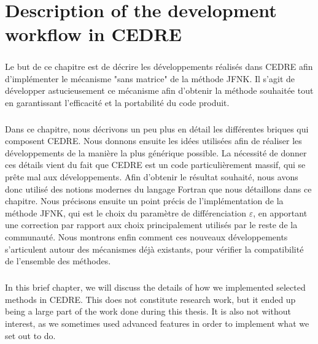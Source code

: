 \chapter{Description of the development workflow in CEDRE}

\begin{tcolorbox}[title=Résumé du chapitre : Description des développements dans CEDRE, colframe=black!50!white]
  \paragraph{}
  Le but de ce chapitre est de décrire les développements réalisés dans CEDRE afin d'implémenter le mécanisme "sans matrice" de la méthode JFNK.
  Il s'agit de développer astucieusement ce mécanisme afin d'obtenir la méthode souhaitée tout en garantissant l'efficacité et la portabilité du code produit.

  \paragraph{}
  Dans ce chapitre, nous décrivons un peu plus en détail les différentes briques qui composent CEDRE.
  Nous donnons ensuite les idées utilisées afin de réaliser les développements de la manière la plus générique possible.
  La nécessité de donner ces détails vient du fait que CEDRE est un code particulièrement massif, qui se prête mal aux développements.
  Afin d'obtenir le résultat souhaité, nous avons donc utilisé des notions modernes du langage Fortran que nous détaillons dans ce chapitre.
  Nous précisons ensuite un point précis de l'implémentation de la méthode JFNK, qui est le choix du paramètre de différenciation $\varepsilon$, en apportant une correction par rapport aux choix principalement utilisés par le reste de la communauté.
  Nous montrons enfin comment ces nouveaux développements s'articulent autour des mécanismes déjà existants, pour vérifier la compatibilité de l'ensemble des méthodes.
\end{tcolorbox}


  \paragraph{}
  In this brief chapter, we will discuss the details of how we implemented selected methods in CEDRE.
  This does not constitute research work, but it ended up being a large part of the work done during this thesis.
  It is also not without interest, as we sometimes used advanced features in order to implement what we set out to do.


